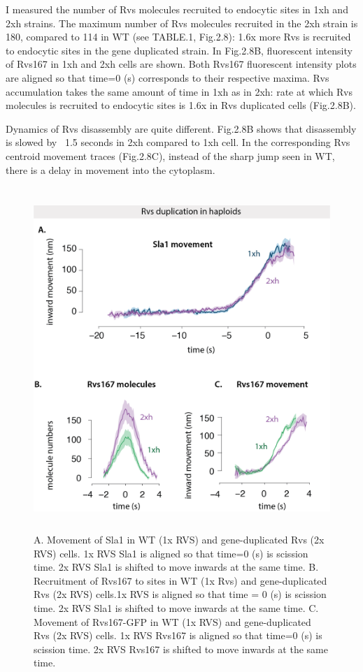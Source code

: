 I measured the number of Rvs molecules recruited to endocytic sites in 1xh and 2xh strains. The maximum number of Rvs molecules recruited in the 2xh strain is 180, compared to 114 in WT (see TABLE.1, Fig.2.8): 1.6x more Rvs is recruited to endocytic sites in the gene duplicated strain. In Fig.2.8B, fluorescent intensity of Rvs167 in 1xh and 2xh cells are shown. Both Rvs167 fluorescent intensity plots are aligned so that time=0 (s) corresponds to their respective maxima. Rvs accumulation takes the same amount of time in 1xh as in 2xh: rate at which Rvs molecules is recruited to endocytic sites is 1.6x in Rvs duplicated cells (Fig.2.8B). 

Dynamics of Rvs disassembly are quite different. Fig.2.8B shows that disassembly is slowed by ~1.5 seconds in 2xh compared to 1xh cell. In the corresponding Rvs centroid movement traces (Fig.2.8C), instead of the sharp jump seen in WT, there is a delay in movement into the cytoplasm.

		
				\vspace{5mm}
				\begin{figure}[h]
				\centering
				\includegraphics[width=13cm,height=13cm,keepaspectratio]{figures/results_final/rvs_haploid3}
				\caption[Overexpression of the Rvs complex in haploid cells]
					{A. Movement of Sla1 in WT (1x RVS) and gene-duplicated Rvs (2x RVS) cells. 1x RVS Sla1 is aligned so that time=0 (s) is scission time. 2x RVS Sla1 is shifted to move inwards at the same time.
					B. Recruitment of Rvs167 to sites in WT (1x Rvs)  and gene-duplicated Rvs (2x RVS) cells.1x RVS is aligned so that time = 0 (s) is scission time. 2x RVS Sla1 is shifted to move inwards at the same time.
					C.  Movement of Rvs167-GFP in WT (1x RVS) and gene-duplicated Rvs (2x RVS) cells. 1x RVS Rvs167 is aligned so that time=0 (s) is scission time. 2x RVS Rvs167 is shifted to move inwards at the same time.
			 \label{fig_rvshaploid}}

				\end{figure}
		
